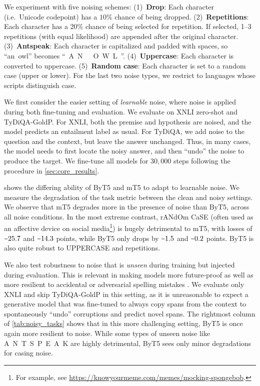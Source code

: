\documentclass[11pt,a4paper]{article}
\newcommand{\minus}{\scalebox{0.7}[1.0]{$-$}}
\begin{document}
We experiment with five noising schemes: (1)~\textbf{Drop}: Each character (i.e.~Unicode codepoint) has a $10$\% chance of being dropped. (2)~\textbf{Repetitions}: Each character has a 20\% chance of being selected for repetition. If selected, 1--3 repetitions (with equal likelihood) are appended after the original character. (3)~\textbf{Antspeak}: Each character is capitalized and padded with spaces, so ``an~owl'' becomes ``~A~N~~~O~W~L~''. (4)~\textbf{Uppercase}: Each character is converted to uppercase. (5)~\textbf{Random case}: Each character is set to a random case (upper or lower). For the last two noise types, we restrict to languages whose scripts distinguish case.

We first consider the easier setting of \emph{learnable} noise, where noise is applied during both fine-tuning and evaluation. We evaluate on XNLI zero-shot and TyDiQA-GoldP\@. For XNLI, both the premise and hypothesis are noised, and the model predicts an entailment label as usual. For TyDiQA, we add noise to the question and the context, but leave the answer unchanged. Thus, in many cases, the model needs to first locate the noisy answer, and then ``undo'' the noise to produce the target. We fine-tune all models for $30{,}000$ steps following the procedure in \cref{sec:core_results}.



 shows the differing ability of ByT5 and mT5 to adapt to learnable noise. We measure the degradation of the task metric between the clean and noisy settings. We observe that mT5 degrades more in the presence of noise than ByT5, across all noise conditions. In the most extreme contrast, rANdOm CaSE (often used as an affective device on social media\footnote{For example, see \url{https://knowyourmeme.com/memes/mocking-spongebob}.}) is hugely detrimental to mT5, with losses of $\minus25.7$ and $\minus14.3$ points, while ByT5 only drops by $\minus1.5$ and $\minus0.2$ points. ByT5 is also quite robust to UPPERCASE and repetitions.

We also test robustness to noise that is \emph{unseen} during training but injected during evaluation. This is relevant in making models more future-proof as well as more resilient to accidental or adversarial spelling mistakes \cite{pruthi-etal-2019-combating, sun-2020-adv-bert}. We evaluate only XNLI and skip TyDiQA-GoldP in this setting, as it is unreasonable to expect a generative model that was fine-tuned to always copy spans from the context to spontaneously ``undo'' corruptions and predict novel spans. The rightmost column of \cref{tab:noisy_tasks} shows that in this more challenging setting, ByT5 is once again more resilient to noise. While some types of unseen noise like A~N~T~S~P~E~A~K are highly detrimental, ByT5 sees only minor degradations for casing noise.
\end{document}
